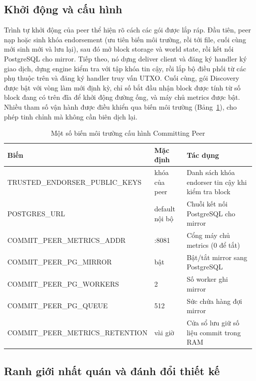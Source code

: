 \subsection{Khởi động và cấu hình}
\label{sec:cp-startup}

Trình tự khởi động của peer thể hiện rõ cách các gói được lắp ráp. Đầu tiên,
peer nạp hoặc sinh khóa endorsement (ưu tiên biến môi trường, rồi tới file,
cuối cùng mới sinh mới và lưu lại), sau đó mở block storage và world state,
rồi kết nối PostgreSQL cho mirror. Tiếp theo, nó dựng deliver client và đăng
ký handler ký giao dịch, dựng engine kiểm tra với tập khóa tin cậy, rồi lắp
bộ điều phối từ các phụ thuộc trên và đăng ký handler truy vấn UTXO. Cuối
cùng, gói Discovery được bật với vòng làm mới định kỳ, chỉ số bắt đầu nhận
block được tính từ số block đang có trên đĩa để khởi động đường ống, và máy
chủ metrics được bật. Nhiều tham số vận hành được điều khiển qua biến môi
trường (Bảng~\ref{tab:cp-env}), cho phép tinh chỉnh mà không cần biên dịch
lại.

\begin{table}[H]
\centering
\caption{Một số biến môi trường cấu hình Committing Peer}
\label{tab:cp-env}
\begin{tabular}{@{}p{5.2cm}p{2.2cm}p{5cm}@{}}
\toprule
Biến & Mặc định & Tác dụng \\
\midrule
TRUSTED\_ENDORSER\_PUBLIC\_KEYS & khóa của peer & Danh sách khóa endorser tin cậy khi kiểm tra block \\
POSTGRES\_URL & default nội bộ & Chuỗi kết nối PostgreSQL cho mirror \\
COMMIT\_PEER\_METRICS\_ADDR & :8081 & Cổng máy chủ metrics (0 để tắt) \\
COMMIT\_PEER\_PG\_MIRROR & bật & Bật/tắt mirror sang PostgreSQL \\
COMMIT\_PEER\_PG\_WORKERS & 2 & Số worker ghi mirror \\
COMMIT\_PEER\_PG\_QUEUE & 512 & Sức chứa hàng đợi mirror \\
COMMIT\_PEER\_METRICS\_RETENTION & vài giờ & Cửa sổ lưu giữ số liệu commit trong RAM \\
\bottomrule
\end{tabular}
\end{table}

\subsection{Ranh giới nhất quán và đánh đổi thiết kế}
\label{sec:cp-tradeoffs}

